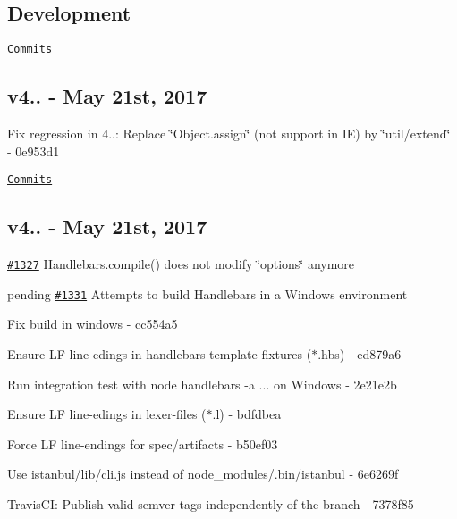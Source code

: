 \subsection*{Development}

\href{https://github.com/nknapp/handlebars.js/compare/v4.0.10...master}{\tt Commits}

\subsection*{v4.. -\/ May 21st, 2017}


\begin{DoxyItemize}
\item Fix regression in 4..\+: Replace \char`\"{}\+Object.\+assign\char`\"{} (not support in IE) by \char`\"{}util/extend\char`\"{} -\/ 0e953d1
\end{DoxyItemize}

\href{https://github.com/nknapp/handlebars.js/compare/v4.0.9...v4.0.10}{\tt Commits}

\subsection*{v4.. -\/ May 21st, 2017}


\begin{DoxyItemize}
\item \href{https://github.com/wycats/handlebars.js/issues/1327}{\tt \#1327} Handlebars.\+compile() does not modify \char`\"{}options\char`\"{} anymore
\item pending \href{https://github.com/wycats/handlebars.js/issues/1331}{\tt \#1331} Attempts to build Handlebars in a Windows environment
\begin{DoxyItemize}
\item Fix build in windows -\/ cc554a5
\item Ensure LF line-\/edings in handlebars-\/template fixtures ($\ast$.hbs) -\/ ed879a6
\item Run integration test with {\ttfamily node handlebars -\/a ...} on Windows -\/ 2e21e2b
\item Ensure LF line-\/edings in lexer-\/files ($\ast$.l) -\/ bdfdbea
\item Force LF line-\/endings for spec/artifacts -\/ b50ef03
\item Use istanbul/lib/cli.\+js instead of node\+\_\+modules/.bin/istanbul -\/ 6e6269f
\end{DoxyItemize}
\item Travis\+CI\+: Publish valid semver tags independently of the branch -\/ 7378f85
\end{DoxyItemize}

